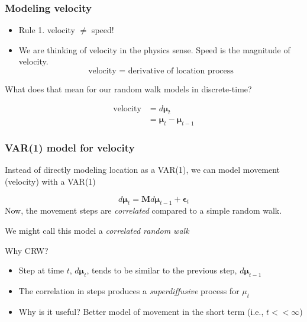 \documentclass[36pt,handout]{beamer}
\newcommand{\ft}[1]{\frametitle{#1}}
\newcommand{\bmu}{\boldsymbol{\mu}}
\newcommand{\be}{\boldsymbol{\epsilon}}
\begin{document}

\begin{frame}
\ft{Modeling velocity}

\begin{itemize}
\item Rule 1. velocity $\ne$ speed! 
\pause
\item We are thinking of velocity in the physics sense. Speed is the magnitude of velocity. 
$$\mbox{velocity = derivative of location process}$$
\end{itemize}
\bigskip

\pause

What does that mean for our random walk models in discrete-time? 

$$
\begin{aligned}
\mbox{velocity} &= d\bmu_t \\ 
&= \bmu_t-\bmu_{t-1} 
\end{aligned}
$$
\end{frame}


\begin{frame}
\ft{VAR(1) model for velocity}

Instead of directly modeling location as a VAR(1), we can model movement (velocity) with a VAR(1)

$$d\bmu_t = \mathbf{M}d\bmu_{t-1} + \be_t$$
Now, the movement steps are {\em correlated} compared to a simple random walk. 
\medskip

\pause

We might call this model  a {\em correlated random walk}
\medskip

\pause

\textcolor{noaaturq}{\Large Why CRW?}
\begin{itemize}
\item Step at time $t$, $d\bmu_t$, tends to be similar to the previous step, $d\bmu_{t-1}$
\item The correlation in steps produces a {\em superdiffusive} process for $\mu_t$
\item Why is it useful? Better model of movement in the short term (i.e., $t<<\infty$)
\end{itemize}
\end{frame}

\end{document}
